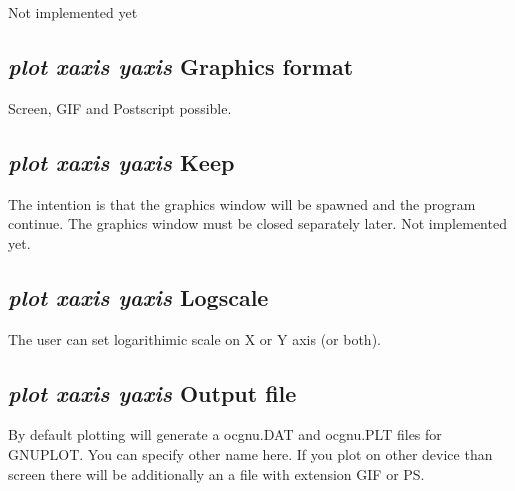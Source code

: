\documentclass[12pt]{article}
\begin{document}
Not implemented yet

\subsection{{\em plot xaxis yaxis} Graphics format}

Screen, GIF and Postscript possible.

\subsection{{\em plot xaxis yaxis} Keep}

The intention is that the graphics window will be spawned and the
program continue.  The graphics window must be closed separately
later.  Not implemented yet.

\subsection{{\em plot xaxis yaxis} Logscale}

The user can set logarithimic scale on X or Y axis (or both).

\subsection{{\em plot xaxis yaxis} Output file}

By default plotting will generate a ocgnu.DAT and ocgnu.PLT files for
GNUPLOT.  You can specify other name here.  If you plot on other
device than screen there will be additionally an a file with extension
GIF or PS.
\end{document}
